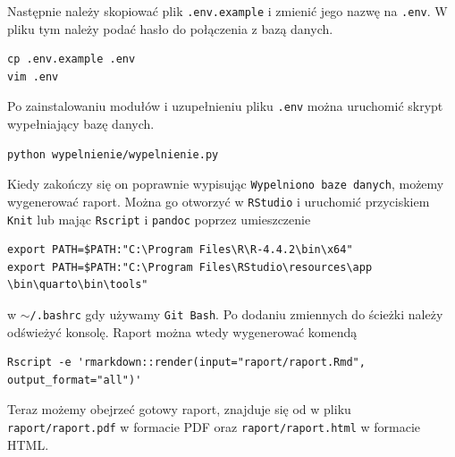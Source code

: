 \documentclass[a4paper,12pt]{mwart}
\begin{document}
Następnie należy skopiować plik \texttt{.env.example} i zmienić jego nazwę na \texttt{.env}. W pliku tym należy podać hasło do połączenia z bazą danych.

\begin{verbatim}
cp .env.example .env
vim .env
\end{verbatim}

Po zainstalowaniu modułów i uzupełnieniu pliku \texttt{.env} można uruchomić skrypt wypełniający bazę danych.

\begin{verbatim}
python wypelnienie/wypelnienie.py
\end{verbatim}

Kiedy zakończy się on poprawnie wypisując \texttt{Wypelniono baze danych}, możemy wygenerować raport. Można go otworzyć w \texttt{RStudio} i uruchomić przyciskiem \texttt{Knit} lub mając \texttt{Rscript} i \texttt{pandoc} poprzez umieszczenie 

\begin{verbatim}
export PATH=$PATH:"C:\Program Files\R\R-4.4.2\bin\x64"
export PATH=$PATH:"C:\Program Files\RStudio\resources\app
\bin\quarto\bin\tools"
\end{verbatim}

\noindent w \texttt{$\sim$/.bashrc} gdy używamy \texttt{Git Bash}. Po dodaniu zmiennych do ścieżki należy odświeżyć konsolę. Raport można wtedy wygenerować komendą

\begin{verbatim}
Rscript -e 'rmarkdown::render(input="raport/raport.Rmd", output_format="all")'
\end{verbatim}

Teraz możemy obejrzeć gotowy raport, znajduje się od w pliku \newline \texttt{raport/raport.pdf} w formacie PDF oraz \texttt{raport/raport.html} w formacie HTML.
\end{document}
